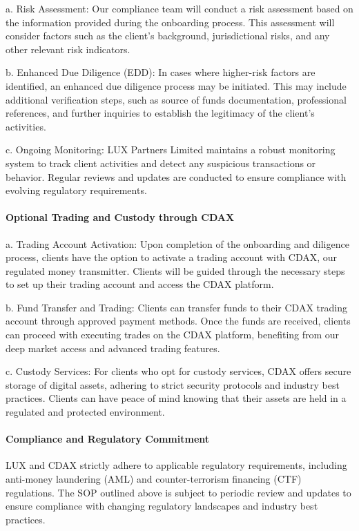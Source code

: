 \documentclass[11pt]{article}
\begin{document}
a. Risk Assessment: Our compliance team will conduct a risk assessment based on the information provided during the onboarding process. This assessment will consider factors such as the client's background, jurisdictional risks, and any other relevant risk indicators.


b. Enhanced Due Diligence (EDD): In cases where higher-risk factors are identified, an enhanced due diligence process may be initiated. This may include additional verification steps, such as source of funds documentation, professional references, and further inquiries to establish the legitimacy of the client's activities.


c. Ongoing Monitoring: LUX Partners Limited maintains a robust monitoring system to track client activities and detect any suspicious transactions or behavior. Regular reviews and updates are conducted to ensure compliance with evolving regulatory requirements.


\paragraph{Optional Trading and Custody through CDAX}

a. Trading Account Activation: Upon completion of the onboarding and diligence process, clients have the option to activate a trading account with CDAX, our regulated money transmitter. Clients will be guided through the necessary steps to set up their trading account and access the CDAX platform.


b. Fund Transfer and Trading: Clients can transfer funds to their CDAX trading account through approved payment methods. Once the funds are received, clients can proceed with executing trades on the CDAX platform, benefiting from our deep market access and advanced trading features.


c. Custody Services: For clients who opt for custody services, CDAX offers secure storage of digital assets, adhering to strict security protocols and industry best practices. Clients can have peace of mind knowing that their assets are held in a regulated and protected environment.


\paragraph{Compliance and Regulatory Commitment}

LUX and CDAX strictly adhere to applicable regulatory requirements, including anti-money laundering (AML) and counter-terrorism financing (CTF) regulations. The SOP outlined above is subject to periodic review and updates to ensure compliance with changing regulatory landscapes and industry best practices.
\end{document}
